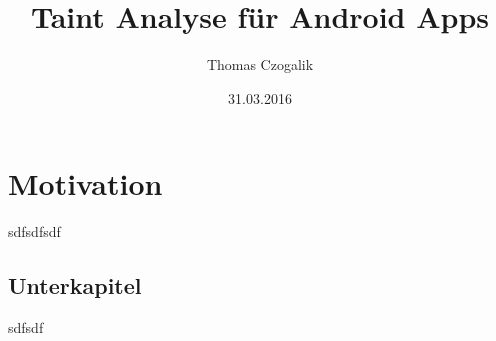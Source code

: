 \documentclass[runningheads,a4paper]{llncs}
\begin{document}
\mainmatter
\title{Taint Analyse für Android Apps}
\author{Thomas Czogalik}
\date{31.03.2016}
\maketitle

\section{Motivation}
sdfsdfsdf
\subsection{Unterkapitel}
sdfsdf
%


\end{document}
